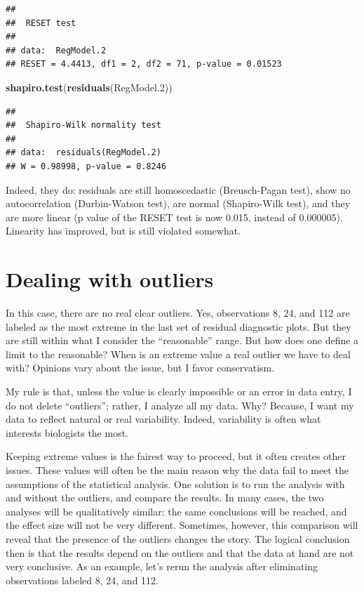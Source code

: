 \documentclass[
  12pt,
]{book}
\newenvironment{Shaded}{\begin{snugshade}}{\end{snugshade}}
\newcommand{\FloatTok}[1]{\textcolor[rgb]{0.00,0.00,0.81}{#1}}
\newcommand{\KeywordTok}[1]{\textcolor[rgb]{0.13,0.29,0.53}{\textbf{#1}}}
\newcommand{\NormalTok}[1]{#1}
\begin{document}
\begin{verbatim}
## 
##  RESET test
## 
## data:  RegModel.2
## RESET = 4.4413, df1 = 2, df2 = 71, p-value = 0.01523
\end{verbatim}

\begin{Shaded}
\begin{Highlighting}[]
\KeywordTok{shapiro.test}\NormalTok{(}\KeywordTok{residuals}\NormalTok{(RegModel}\FloatTok{.2}\NormalTok{))}
\end{Highlighting}
\end{Shaded}

\begin{verbatim}
## 
##  Shapiro-Wilk normality test
## 
## data:  residuals(RegModel.2)
## W = 0.98998, p-value = 0.8246
\end{verbatim}

Indeed, they do: residuals are still homoscedastic (Breusch-Pagan test), show no autocorrelation (Durbin-Watson test), are normal (Shapiro-Wilk test), and they are more linear (p value of the RESET test is now 0.015, instead of 0.000005). Linearity has improved, but is still violated somewhat.

\hypertarget{dealing-with-outliers}{%
\section{Dealing with outliers}\label{dealing-with-outliers}}

In this case, there are no real clear outliers. Yes, observations 8, 24, and 112 are labeled as the most extreme in the last set of residual diagnostic plots. But they are still within what I consider the ``reasonable'' range. But how does one define a limit to the reasonable? When is an extreme value a real outlier we have to deal with? Opinions vary about the issue, but I favor conservatism.

My rule is that, unless the value is clearly impossible or an error in data entry, I do not delete ``outliers''; rather, I analyze all my data. Why? Because, I want my data to reflect natural or real variability. Indeed, variability is often what interests biologists the most.

Keeping extreme values is the fairest way to proceed, but it often creates other issues. These values will often be the main reason why the data fail to meet the assumptions of the statistical analysis. One solution is to run the analysis with and without the outliers, and compare the results. In many cases, the two analyses will be qualitatively similar: the same conclusions will be reached, and the effect size will not be very different. Sometimes, however, this comparison will reveal that the presence of the outliers changes the story. The logical conclusion then is that the results depend on the outliers and that the data at hand are not very conclusive. As an example, let's rerun the analysis after eliminating observations labeled 8, 24, and 112.
\end{document}
